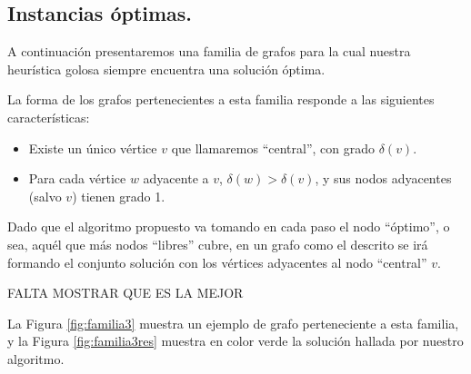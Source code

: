 \vspace*{0.6cm}

\subsection{Instancias óptimas.}

\vspace*{0.3cm}

A continuación presentaremos una familia de grafos para la cual nuestra heurística golosa siempre encuentra una solución óptima.

La forma de los grafos pertenecientes a esta familia responde a las siguientes características:

\begin{itemize}
\item Existe un único vértice $v$ que llamaremos ``central'', con grado $\delta(v)$.
\item Para cada vértice $w$ adyacente a $v$, $\delta(w) > \delta(v)$, y sus nodos adyacentes (salvo $v$) tienen grado 1.	
\end{itemize}

Dado que el algoritmo propuesto va tomando en cada paso el nodo ``óptimo'', o sea, aquél que más nodos ``libres'' cubre, en un grafo como el descrito se irá formando el conjunto solución con los vértices adyacentes al nodo ``central'' $v$.  

FALTA MOSTRAR QUE ES LA MEJOR

La Figura \ref{fig:familia3} muestra un ejemplo de grafo perteneciente a esta familia, y la Figura \ref{fig:familia3res} muestra en color verde la solución hallada por nuestro algoritmo.

